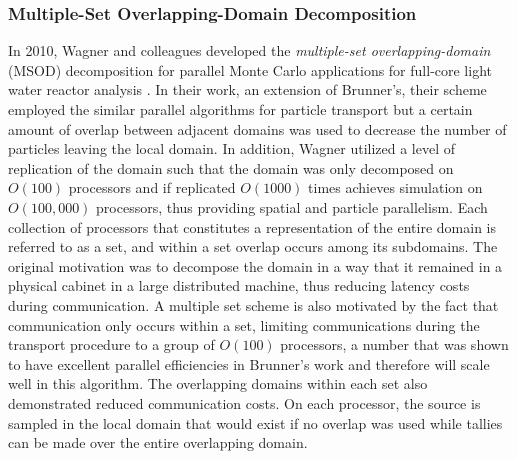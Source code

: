 \subsubsection{Multiple-Set Overlapping-Domain Decomposition}
\label{subsubsec:msod}
In 2010, Wagner and colleagues developed the \textit{multiple-set
  overlapping-domain} (MSOD) decomposition for parallel Monte Carlo
applications for full-core light water reactor analysis
\citep{wagner_hybrid_2010}. In their work, an extension of Brunner's,
their scheme employed the similar parallel algorithms for particle
transport but a certain amount of overlap between adjacent domains was
used to decrease the number of particles leaving the local domain. In
addition, Wagner utilized a level of replication of the domain such
that the domain was only decomposed on $O(100)$ processors and if
replicated $O(1000)$ times achieves simulation on $O(100,000)$
processors, thus providing spatial and particle parallelism. Each
collection of processors that constitutes a representation of the
entire domain is referred to as a set, and within a set overlap occurs
among its subdomains. The original motivation was to decompose the
domain in a way that it remained in a physical cabinet in a large
distributed machine, thus reducing latency costs during
communication. A multiple set scheme is also motivated by the fact
that communication only occurs within a set, limiting communications
during the transport procedure to a group of $O(100)$ processors, a
number that was shown to have excellent parallel efficiencies in
Brunner's work and therefore will scale well in this algorithm. The
overlapping domains within each set also demonstrated reduced
communication costs. On each processor, the source is sampled in the
local domain that would exist if no overlap was used while tallies can
be made over the entire overlapping domain. 

